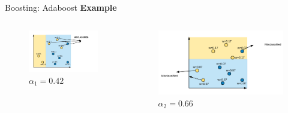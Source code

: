 \documentclass{beamer}
\begin{document}
\begin{frame}{Boosting: Adaboost}
  \textbf{Example}
	\begin{columns}
		\pause 			\begin{column}{0.33\textwidth}
				\centering
				\begin{figure}
					\includegraphics[width = \textwidth]{../assets/ensemble/diagrams/ada_iter1_misclassify}
									\vspace{-20pt}
					\caption{$\alpha_1=0.42$}
				\end{figure}
				
			\end{column}
			
			
			\pause \begin{column}{0.4\textwidth}
				\centering
				\begin{figure}
					\includegraphics[width = \textwidth]{../assets/ensemble/diagrams/ada_iter2_misclassify}
					\vspace{-20pt}
					\caption{$\alpha_2=0.66$}
				\end{figure}
	

\end{column}
\end{columns}
\end{frame}
\end{document}
